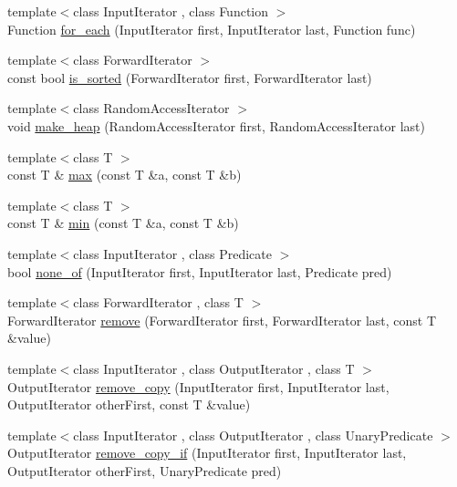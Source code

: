 \begin{DoxyCompactItemize}
\item 
{\footnotesize template$<$class Input\+Iterator , class Function $>$ }\\Function \hyperlink{namespaceprism_aae062d5bfdc0e53ae49c56520aded906}{for\+\_\+each} (Input\+Iterator first, Input\+Iterator last, Function func)
\item 
{\footnotesize template$<$class Forward\+Iterator $>$ }\\const bool \hyperlink{namespaceprism_acf5efbeb096446c47690b9e8bd2cc01a}{is\+\_\+sorted} (Forward\+Iterator first, Forward\+Iterator last)
\item 
{\footnotesize template$<$class Random\+Access\+Iterator $>$ }\\void \hyperlink{namespaceprism_af8e36230e6cb92a41aaca282772a9e6e}{make\+\_\+heap} (Random\+Access\+Iterator first, Random\+Access\+Iterator last)
\item 
{\footnotesize template$<$class T $>$ }\\const T \& \hyperlink{namespaceprism_a812456273adfa37979e79f07e731d412}{max} (const T \&a, const T \&b)
\item 
{\footnotesize template$<$class T $>$ }\\const T \& \hyperlink{namespaceprism_a10aff0aca673fb1837069dd8967e4738}{min} (const T \&a, const T \&b)
\item 
{\footnotesize template$<$class Input\+Iterator , class Predicate $>$ }\\bool \hyperlink{namespaceprism_a10c83b433c7f98fd4513f1b68c6db594}{none\+\_\+of} (Input\+Iterator first, Input\+Iterator last, Predicate pred)
\item 
{\footnotesize template$<$class Forward\+Iterator , class T $>$ }\\Forward\+Iterator \hyperlink{namespaceprism_aeddd21943bcf811c56f7d9d1bd4784f6}{remove} (Forward\+Iterator first, Forward\+Iterator last, const T \&value)
\item 
{\footnotesize template$<$class Input\+Iterator , class Output\+Iterator , class T $>$ }\\Output\+Iterator \hyperlink{namespaceprism_ab7b6fb407340e51749169560b48fb20c}{remove\+\_\+copy} (Input\+Iterator first, Input\+Iterator last, Output\+Iterator other\+First, const T \&value)
\item 
{\footnotesize template$<$class Input\+Iterator , class Output\+Iterator , class Unary\+Predicate $>$ }\\Output\+Iterator \hyperlink{namespaceprism_abfc7da1f951e480a26d58fc098b78844}{remove\+\_\+copy\+\_\+if} (Input\+Iterator first, Input\+Iterator last, Output\+Iterator other\+First, Unary\+Predicate pred)

\end{DoxyCompactItemize}
